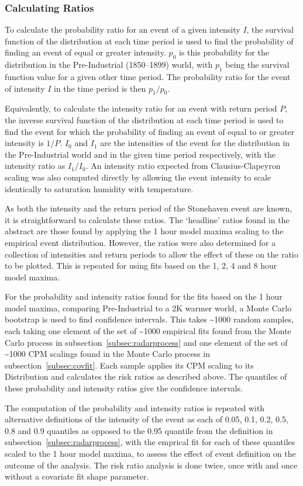 \subsubsection{Calculating Ratios}

To calculate the probability ratio for an event of a given intensity $I$,
    the survival function of the distribution at each time period is used to find the probability of finding an event of equal or greater intensity.
$p_0$ is this probability for the distribution in the Pre-Industrial (1850--1899) world,
    with $p_1$ being the survival function value for a given other time period.
The probability ratio for the event of intensity $I$ in the time period is then $p_1/p_0$.

Equivalently, to calculate the intensity ratio for an event with return period $P$,
    the inverse survival function of the distribution at each time period is used to find the event for which the probability of finding an event of equal to or greater intensity is $1/P$.
$I_0$ and $I_1$ are the intensities of the event for the distribution in the Pre-Industrial world and in the given time period respectively,
    with the intensity ratio as $I_1/I_0$.
An intensity ratio expected from Clausius-Clapeyron scaling was also computed directly by allowing the event intensity to scale identically to saturation humidity with temperature.

As both the intensity and the return period of the Stonehaven event are known,
    it is straightforward to calculate these ratios.
The `headline' ratios found in the abstract are those found by applying the 1 hour model maxima scaling to the empirical event distribution.
However, the ratios were also determined for a collection of intensities and return periods to allow the effect of these on the ratio to be plotted.
This is repeated for using fits based on the 1, 2, 4 and 8 hour model maxima.

For the probability and intensity ratios found for the fits based on the 1 hour model maxima,
    comparing Pre-Industrial to a 2K warmer world,
    a Monte Carlo bootstrap is used to find confidence intervals.
This takes \textasciitilde1000 random samples, each taking one element of the set of \textasciitilde1000 empirical fits found from the Monte Carlo process in subsection~\ref{subsec:radarprocess}
    and one element of the set of \textasciitilde1000 CPM scalings found in the Monte Carlo process in subsection~\ref{subsec:covfit}.
Each sample applies its CPM scaling to its Distribution and calculates the risk ratios as described above.
The quantiles of these probability and intensity ratios give the confidence intervals.

The computation of the probability and intensity ratios is repeated with alternative definitions of the intensity of the event
    as each of 0.05, 0.1, 0.2, 0.5, 0.8 and 0.9 quantiles as opposed to the 0.95 quantile from the definition in subsection~\ref{subsec:radarprocess},
    with the emprical fit for each of these quantiles scaled to the 1 hour model maxima,
    to assess the effect of event definition on the outcome of the analysis.
The risk ratio analysis is done twice, once with and once without a covariate fit shape parameter.